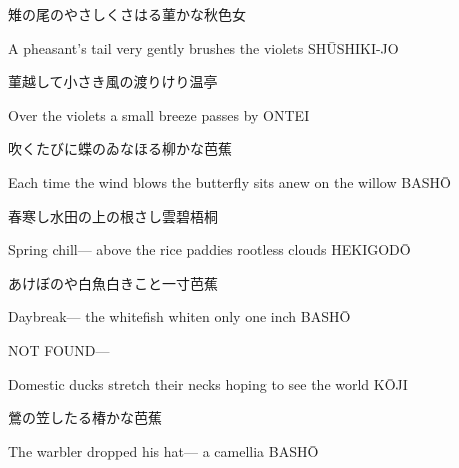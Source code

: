 \begin{haiku}
    {\FH 雉の尾のやさしくさはる菫かな}\hfill{\FH 秋色女}

    \vin{} A pheasant's tail
    \vin{} \vin{} very gently brushes
    \vin{} \vin{} \vin{} the violets \hspace{\fill} SH\={U}SHIKI-JO
\end{haiku}

\begin{haiku}
    {\FH 菫越して小さき風の渡りけり}\hfill{\FH 温亭}

    \vin{} Over the violets
    \vin{} \vin{} a small breeze
    \vin{} \vin{} \vin{} passes by \hspace{\fill} ONTEI
\end{haiku}

\begin{haiku}
    {\FH 吹くたびに蝶のゐなほる柳かな}\hfill{\FH 芭蕉}

    \vin{} Each time the wind blows
    \vin{} \vin{} the butterfly sits anew
    \vin{} \vin{} \vin{} on the willow \hspace{\fill} BASH\={O}
\end{haiku}

\begin{haiku}
    {\FH 春寒し水田の上の根さし雲}\hfill{\FH 碧梧桐}

    \vin{} Spring chill---
    \vin{} \vin{} above the rice paddies
    \vin{} \vin{} \vin{} rootless clouds \hspace{\fill} HEKIGOD\={O}
\end{haiku}

\begin{haiku}
    {\FH あけぼのや白魚白きこと一寸}\hfill{\FH 芭蕉}

    \vin{} Daybreak---
    \vin{} \vin{} the whitefish whiten
    \vin{} \vin{} \vin{} only one inch \hspace{\fill} BASH\={O}
\end{haiku}

\begin{haiku}
    {NOT FOUND}\hfill{---}

    \vin{} Domestic ducks
    \vin{} \vin{} stretch their necks
    \vin{} \vin{} \vin{} hoping to see the world \hspace{\fill} K\={O}JI
\end{haiku}

\begin{haiku}
    {\FH 鶯の笠したる椿かな}\hfill{\FH 芭蕉}

    \vin{} The warbler
    \vin{} \vin{} dropped his hat---
    \vin{} \vin{} \vin{} a camellia \hspace{\fill} BASH\={O}
\end{haiku}

